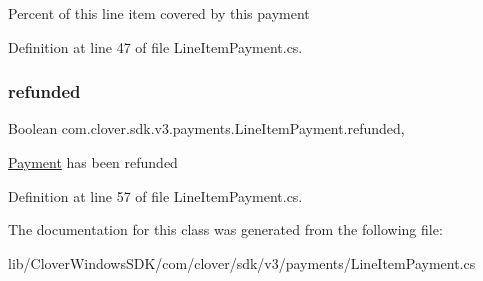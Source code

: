 Percent of this line item covered by this payment 



Definition at line 47 of file Line\+Item\+Payment.\+cs.

\mbox{\label{classcom_1_1clover_1_1sdk_1_1v3_1_1payments_1_1_line_item_payment_af51ba6631bf7e29f9379566a7bf840b5}} 
\subsubsection{\texorpdfstring{refunded}{refunded}}
{\footnotesize\ttfamily Boolean com.\+clover.\+sdk.\+v3.\+payments.\+Line\+Item\+Payment.\+refunded\hspace{0.3cm}{\ttfamily [get]}, {\ttfamily [set]}}



\hyperlink{classcom_1_1clover_1_1sdk_1_1v3_1_1payments_1_1_payment}{Payment} has been refunded 



Definition at line 57 of file Line\+Item\+Payment.\+cs.



The documentation for this class was generated from the following file\+:\begin{DoxyCompactItemize}
\item 
lib/\+Clover\+Windows\+S\+D\+K/com/clover/sdk/v3/payments/Line\+Item\+Payment.\+cs\end{DoxyCompactItemize}

